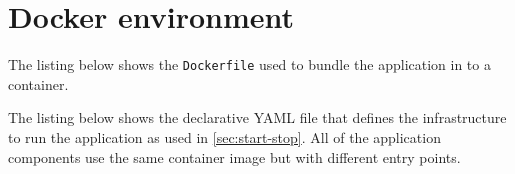 \documentclass[../report.tex]{subfiles}
\begin{document}
\section{Docker environment} \label{sec:apdx-docker}

	The listing below shows the \texttt{Dockerfile} used to bundle the application in to a container.



	The listing below shows the declarative YAML file that defines the infrastructure to run the application as used in \cref{sec:start-stop}.  All of the application components use the same container image but with different entry points.
	

\end{document}
